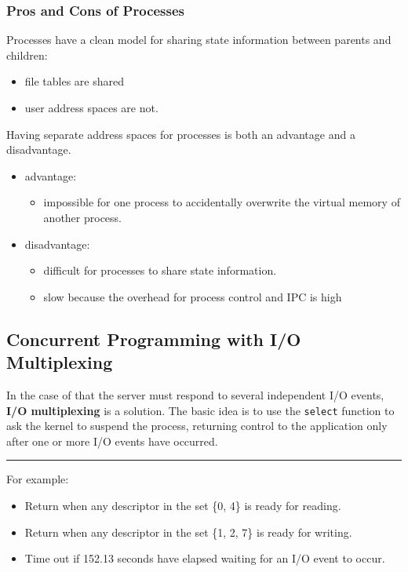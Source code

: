 \documentclass[11pt]{article}
\begin{document}
\subsubsection{Pros and Cons of Processes}
\label{sec:org0670957}
Processes have a clean model for sharing state information between parents and children:\\
\begin{itemize}
\item file tables are shared\\
\item user address spaces are not.\\
\end{itemize}

Having separate address spaces for processes is both an advantage and a disadvantage.\\
\begin{itemize}
\item advantage:\\
\begin{itemize}
\item impossible for one process to accidentally overwrite the virtual memory of another process.\\
\end{itemize}
\item disadvantage:\\
\begin{itemize}
\item difficult for processes to share state information.\\
\item slow because the overhead for process control and IPC is high\\
\end{itemize}
\end{itemize}


\subsection{Concurrent Programming with I/O Multiplexing}
\label{sec:orgb6733d1}
In the case of that the server must respond to several independent I/O events, \textbf{I/O multiplexing} is a solution. The basic idea is to use the \texttt{select} function to ask the kernel to suspend the process, returning control to the application only after one or more I/O events have occurred.\\

\noindent\rule{\textwidth}{0.5pt}
For example:\\
\begin{itemize}
\item Return when any descriptor in the set \{0, 4\} is ready for reading.\\
\item Return when any descriptor in the set \{1, 2, 7\} is ready for writing.\\
\item Time out if 152.13 seconds have elapsed waiting for an I/O event to occur.\\
\end{itemize}
\end{document}

